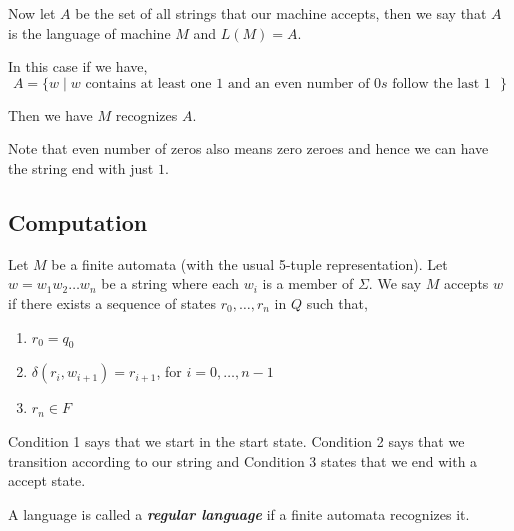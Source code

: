 Now let $A$ be the set of all strings that our machine accepts, then we say that $A$ is the language of machine $M$  and $L(M) = A$.

\vspace{1em}

In this case if we have, 
\[
    A = \{w \mid w \text{ contains at least one $1$ and an even number of $0s$ follow the last $1$ }\}
\]

Then we have $M$ recognizes $A$.
\begin{note}
    Note that even number of zeros also means zero zeroes and hence we can have the string end with just $1$.
\end{note}

\subsection{Computation}
Let $M$ be a finite automata (with the usual 5-tuple representation). Let $w = w_{1}w_{2}\dots w_n$ be a string where each $w_i$ is a member of $\Sigma$. We say $M$ accepts $w$ if there exists a sequence of states $r_{0}, \dots, r_n$ in $Q$ such that, 
\begin{enumerate}
    \item $r_{0} = q_{0}$
    \item $\delta(r_i, w_{i + 1}) = r_{i + 1}$, for $i = 0, \dots, n - 1$
    \item $r_n \in F$
\end{enumerate}
\begin{remark}
    Condition 1 says that we start in the start state. Condition 2 says that we transition according to our string and Condition 3 states that we end with a accept state.
\end{remark}

\begin{definition}
    A language is called a \textbf{\emph{regular language}} if a finite automata recognizes it. 
\end{definition}

